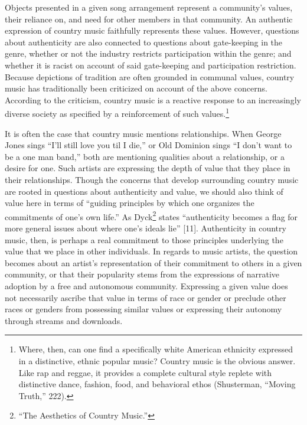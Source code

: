 \documentclass[phdthesis,12pt,final]{wuthesis}
\theoremstyle{definition}
\theoremstyle{definition}
\theoremstyle{definition}
\theoremstyle{definition}
\theoremstyle{remark}
\begin{document}
Objects presented in a given song arrangement represent a community's values, their reliance on, and need for other members in that community. An authentic expression of country music faithfully represents these values. However, questions about authenticity are also connected to questions about gate-keeping in the genre, whether or not the industry restricts participation within the genre; and whether it is racist on account of said gate-keeping and participation restriction. Because depictions of tradition are often grounded in communal values, country music has traditionally been criticized on account of the above concerns. According to the criticism, country music is a reactive response to an increasingly diverse society as specified by a reinforcement of such values.\footnote{Where, then, can one find a specifically white American ethnicity expressed in a distinctive, ethnic popular music? Country music is the obvious answer. Like rap and reggae, it provides a complete cultural style replete with distinctive dance, fashion, food, and behavioral ethos (Shusterman, {``Moving {Truth},''} 222).}

It is often the case that country music mentions relationships. When George Jones sings ``I'll still love you til I die,'' or Old Dominion sings ``I don't want to be a one man band,'' both are mentioning qualities about a relationship, or a desire for one. Such artists are expressing the depth of value that they place in their relationships. Though the concerns that develop surrounding country music are rooted in questions about authenticity and value, we should also think of value here in terms of ``guiding principles by which one organizes the commitments of one's own life.'' As Dyck\footnote{{``The Aesthetics of Country Music.''}} states ``authenticity becomes a flag for more general issues about where one's ideals lie'' {[}11{]}. Authenticity in country music, then, is perhaps a real commitment to those principles underlying the value that we place in other individuals. In regards to music artists, the question becomes about an artist's representation of their commitment to others in a given community, or that their popularity stems from the expressions of narrative adoption by a free and autonomous community. Expressing a given value does not necessarily ascribe that value in terms of race or gender or preclude other races or genders from possessing similar values or expressing their autonomy through streams and downloads.
\end{document}
